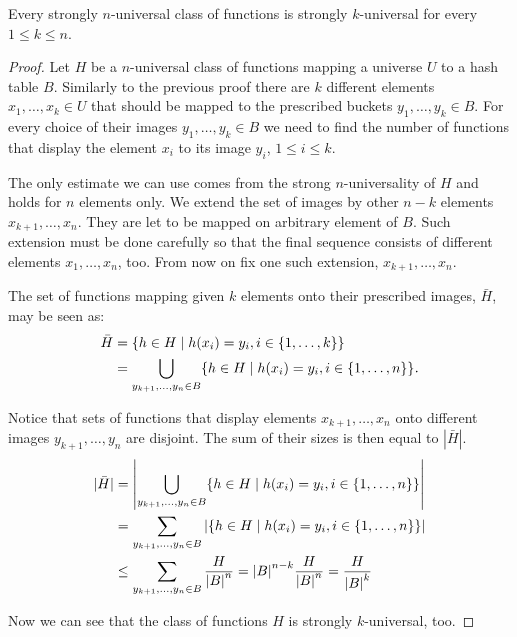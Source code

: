 \begin{remark}
\label{remark-n-to-k}
Every strongly $n$-universal class of functions is strongly $k$-universal for every $1 \leq k \leq n$.
\end{remark}
\begin{proof}
Let $H$ be a $n$-universal class of functions mapping a universe $U$ to a hash table $B$. Similarly to the previous proof there are $k$ different elements $x_1, \dots, x_k \in U$ that should be mapped to the prescribed buckets $y_1, \dots, y_k \in B$. For every choice of their images $y_1, \dots, y_k \in B$ we need to find the number of functions that display the element $x_i$ to its image $y_i$, $1 \leq i \leq k$. 

The only estimate we can use comes from the strong $n$-universality of $H$ and holds for $n$ elements only. We extend the set of images by other $n - k$ elements $x_{k + 1}, \dots, x_n$. They are let to be mapped on arbitrary element of $B$. Such extension must be done carefully so that the final sequence consists of different elements $x_1, \dots, x_n$, too. From now on fix one such extension, $x_{k + 1}, \dots, x_n$.

The set of functions mapping given $k$ elements onto their prescribed images, $\bar H$, may be seen as:
\[
\begin{split}
\bar{H}	& = \lbrace h \in H \mid h(x_i) = y_i, i \in \lbrace 1, \dots, k \rbrace \rbrace \\
	& = \displaystyle \bigcup_{y_{k+1}, \dots, y_n \in B} \lbrace h \in H \mid h(x_i) = y_i, i \in \lbrace 1, \dots, n \rbrace \rbrace \textit{.}
\end{split}
\]

Notice that sets of functions that display elements $x_{k + 1}, \dots, x_n$ onto different images $y_{k + 1}, \dots, y_n$ are disjoint. The sum of their sizes is then equal to $|\bar H|$.
\[
\begin{split}
|\bar H|& = \left| \displaystyle \bigcup_{y_{k+1}, \dots, y_n \in B} \lbrace h \in H \mid h(x_i) = y_i, i \in \lbrace 1, \dots, n \rbrace \rbrace \right| \\
	& = \displaystyle \sum_{y_{k+1}, \dots, y_n \in B} \left| \lbrace h \in H \mid h(x_i) = y_i, i \in \lbrace 1, \dots, n \rbrace \rbrace \right| \\
	& \leq \displaystyle \sum_{y_{k+1}, \dots, y_n \in B} \frac{H}{{|B|}^{n}} = {|B|}^{n - k} \frac{H}{{|B|}^{n}} = \frac{H}{{|B|}^{k}}
\end{split}
\]

Now we can see that the class of functions $H$ is strongly $k$-universal, too.
\end{proof}

